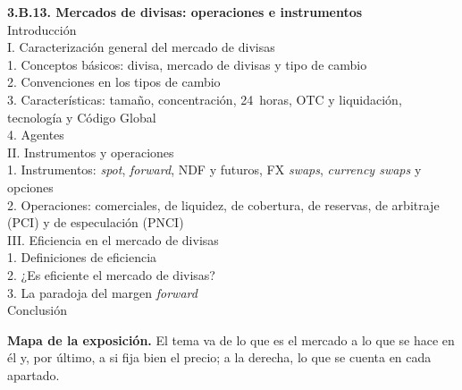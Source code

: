 \documentclass[11pt]{article}
\begin{document}
\begin{esquema}
\textbf{3.B.13. Mercados de divisas: operaciones e instrumentos}\\[2pt]
Introducción\\
I. Caracterización general del mercado de divisas\\
\hspace*{1.5em}1. Conceptos básicos: divisa, mercado de divisas y tipo de cambio\\
\hspace*{1.5em}2. Convenciones en los tipos de cambio\\
\hspace*{1.5em}3. Características: tamaño, concentración, 24~horas, OTC y liquidación, tecnología y Código Global\\
\hspace*{1.5em}4. Agentes\\
II. Instrumentos y operaciones\\
\hspace*{1.5em}1. Instrumentos: \emph{spot}, \emph{forward}, NDF y futuros, FX \emph{swaps}, \emph{currency swaps} y opciones\\
\hspace*{1.5em}2. Operaciones: comerciales, de liquidez, de cobertura, de reservas, de arbitraje (PCI) y de especulación (PNCI)\\
III. Eficiencia en el mercado de divisas\\
\hspace*{1.5em}1. Definiciones de eficiencia\\
\hspace*{1.5em}2. ¿Es eficiente el mercado de divisas?\\
\hspace*{1.5em}3. La paradoja del margen \emph{forward}\\
Conclusión
\end{esquema}

\begin{anotaciones}
\textbf{Mapa de la exposición.} El tema va de lo que es el mercado a lo que se hace en él y, por último, a si fija bien el precio; a la derecha, lo que se cuenta en cada apartado.
\begin{infografiacaja}
\caption{Mapa del tema: la pregunta de cada bloque, sus apartados y el hilo que los une}\label{figu:mapa-tema}
\end{infografiacaja}
\end{anotaciones}
\end{document}
